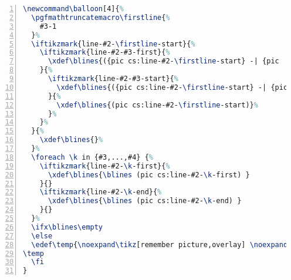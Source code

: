 \documentclass[a4paper]{article}
\begin{document}
\newcommand\balloon[4]{%
  \pgfmathtruncatemacro\firstline{%
    #3-1
  }%
  \iftikzmark{line-#2-\firstline-start}{%
    \iftikzmark{line-#2-#3-first}{%
      \xdef\blines{({pic cs:line-#2-\firstline-start} -| {pic           cs:line-#2-#3-first})}%
    }{%
      \iftikzmark{line-#2-#3-start}{%
        \xdef\blines{({pic cs:line-#2-\firstline-start} -| {pic             cs:line-#2-#3-start})}%
      }{%
        \xdef\blines{(pic cs:line-#2-\firstline-start)}%
      }%
    }%
  }{%
    \xdef\blines{}%
  }%
  \foreach \k in {#3,...,#4} {%
    \iftikzmark{line-#2-\k-first}{%
      \xdef\blines{\blines (pic cs:line-#2-\k-first) }
    }{}
    \iftikzmark{line-#2-\k-end}{%
      \xdef\blines{\blines (pic cs:line-#2-\k-end) }
    }{}
  }%
  \ifx\blines\empty
  \else
  \edef\temp{\noexpand\tikz[remember picture,overlay]\noexpand\node[fit={\blines},balloon] (#1) {};}%
\temp
  \fi
}


\begin{lstlisting}[language=TeX,name=texcode,numbers=left,breakatwhitespace=true,breaklines=true]
\newcommand\balloon[4]{%
  \pgfmathtruncatemacro\firstline{%
    #3-1
  }%
  \iftikzmark{line-#2-\firstline-start}{%
    \iftikzmark{line-#2-#3-first}{%
      \xdef\blines{({pic cs:line-#2-\firstline-start} -| {pic           cs:line-#2-#3-first})}%
    }{%
      \iftikzmark{line-#2-#3-start}{%
        \xdef\blines{({pic cs:line-#2-\firstline-start} -| {pic             cs:line-#2-#3-start})}%
      }{%
        \xdef\blines{(pic cs:line-#2-\firstline-start)}%
      }%
    }%
  }{%
    \xdef\blines{}%
  }%
  \foreach \k in {#3,...,#4} {%
    \iftikzmark{line-#2-\k-first}{%
      \xdef\blines{\blines (pic cs:line-#2-\k-first) }
    }{}
    \iftikzmark{line-#2-\k-end}{%
      \xdef\blines{\blines (pic cs:line-#2-\k-end) }
    }{}
  }%
  \ifx\blines\empty
  \else
  \edef\temp{\noexpand\tikz[remember picture,overlay] \noexpand\node[fit={\blines},balloon] (#1) {};}%
\temp
  \fi
}
\end{lstlisting}

\end{document}
